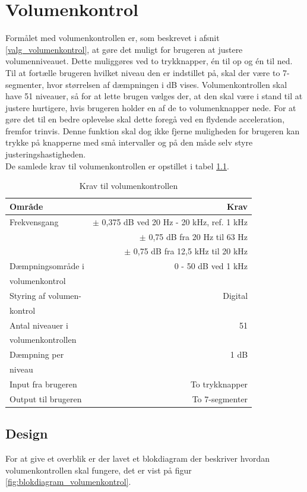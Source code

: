 \chapter{Volumenkontrol}
\label{volumenkontrol}
Formålet med volumenkontrollen er, som beskrevet i afsnit \ref{valg_volumenkontrol}, at gøre det muligt for brugeren at justere volumenniveauet. Dette muliggøres ved to trykknapper, én til op og én til ned. Til at fortælle brugeren hvilket niveau den er indstillet på, skal der være to 7-segmenter, hvor størrelsen af dæmpningen i dB vises. Volumenkontrollen skal have 51 niveauer, så for at lette brugen vælges der, at den skal være i stand til at justere hurtigere, hvis brugeren holder en af de to volumenknapper nede. For at gøre det til en bedre oplevelse skal dette foregå ved en flydende acceleration, fremfor trinvis. Denne funktion skal dog ikke fjerne muligheden for brugeren kan trykke på knapperne med små intervaller og på den måde selv styre justeringshastigheden. \\
De samlede krav til volumenkontrollen er opstillet i tabel \ref{tab:krav_volumenkontrol}.

\begin{table}[h]
\centering
\begin{tabular}{l|r}
\hline\hline
Område & Krav \\
\hline\hline
Frekvensgang & $\pm$ 0,375 dB ved 20 Hz - 20 kHz, ref. 1 kHz \\
& $\pm$ 0,75 dB fra 20 Hz til 63 Hz \\
& $\pm$ 0,75 dB fra 12,5 kHz til 20 kHz \\[4pt]
Dæmpningsområde i & 0 - 50 dB ved 1 kHz \\
volumenkontrol & \\[4pt]
Styring af volumen- & Digital \\
kontrol & \\[4pt]
Antal niveauer i & 51 \\
volumenkontrollen & \\[4pt]
Dæmpning per & 1 dB \\
niveau & \\[4pt]
Input fra brugeren & To trykknapper \\[4pt]
Output til brugeren & To 7-segmenter \\
\hline\hline
\end{tabular}
\caption{Krav til volumenkontrollen}
\label{tab:krav_volumenkontrol}
\end{table}

\clearpage
\section{Design}
\label{volumenkontrol-design}
For at give et overblik er der lavet et blokdiagram der beskriver hvordan volumenkontrollen skal fungere, det er vist på figur \ref{fig:blokdiagram_volumenkontrol}.

